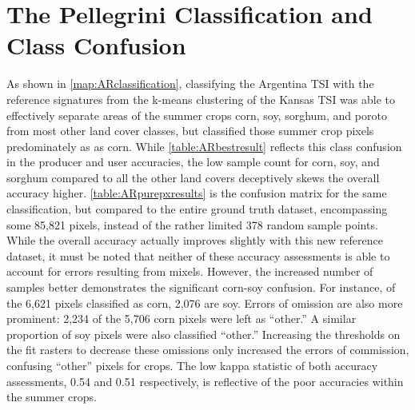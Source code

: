 \section{The Pellegrini Classification and Class Confusion}

As shown in \autoref{map:ARclassification}, classifying the Argentina TSI with the reference signatures from the k-means clustering of the Kansas TSI was able to effectively separate areas of the summer crops corn, soy, sorghum, and poroto from most other land cover classes, but classified those summer crop pixels predominately as as corn. While \autoref{table:ARbestresult} reflects this class confusion in the producer and user accuracies, the low sample count for corn, soy, and sorghum compared to all the other land covers deceptively skews the overall accuracy higher. \autoref{table:ARpurepxresults} is the confusion matrix for the same classification, but compared to the entire ground truth dataset, encompassing some 85,821 pixels, instead of the rather limited 378 random sample points. While the overall accuracy actually improves slightly with this new reference dataset, it must be noted that neither of these accuracy assessments is able to account for errors resulting from mixels. However, the increased number of samples better demonstrates the significant corn-soy confusion. For instance, of the 6,621 pixels classified as corn, 2,076 are soy. Errors of omission are also more prominent: 2,234 of the 5,706 corn pixels were left as ``other.'' A similar proportion of soy pixels were also classified ``other.'' Increasing the thresholds on the fit rasters to decrease these omissions only increased the errors of commission, confusing ``other'' pixels for crops. The low kappa statistic of both accuracy assessments, 0.54 and 0.51 respectively, is reflective of the poor accuracies within the summer crops.


